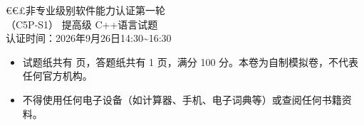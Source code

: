 \documentclass[a4paper]{ctexart}
\newcommand{\wdot}{{\fontsize{12}{12}\selectfont\textbullet}}
\begin{document}
\begin{center}
{\dengxian
    {\fontsize{15.95}{1} €€£非专业级别软件能力认证第一轮} \\[1.5em]
    {\fontsize{15.95}{1}\selectfont （C5P-S1） 提高级 C++\hspace{0pt}语言试题} \\[1.5em]
    {\fontsize{14.05}{1}\selectfont 认证时间：2026年9月26日14:30\textasciitilde16:30}
}
\end{center}

\vspace{8pt}
\begin{itemize}[leftmargin=2.6em, itemsep=1pt, label={}]
    \item \wdot\hspace{0.5em}试题纸共有 \pageref{LastPage} 页，答题纸共有 1 页，满分 100 分。本卷为自制模拟卷，不代表任何官方机构。
    \item \wdot\hspace{0.5em}不得使用任何电子设备（如计算器、手机、电子词典等）或查阅任何书籍资料。
\end{itemize}
\end{document}
